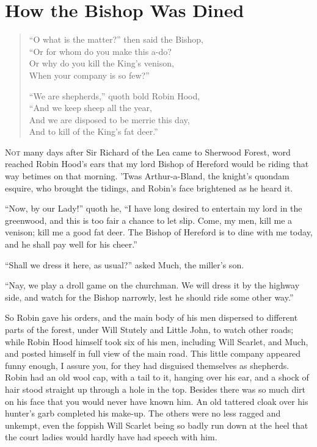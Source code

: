 \chapter{How the Bishop Was Dined}

\begin{quote}
``O what is the matter?'' then said the Bishop,\\
``Or for whom do you make this a-do?\\
Or why do you kill the King's venison,\\
When your company is so few?''

``We are shepherds,'' quoth bold Robin Hood,\\
``And we keep sheep all the year,\\
And we are disposed to be merrie this day,\\
And to kill of the King's fat deer.''
\end{quote}

\lettrine{N}{ot} many days after Sir Richard of the Lea came to Sherwood
Forest, word reached Robin Hood's ears that my lord Bishop of Hereford
would be riding that way betimes on that morning. 'Twas Arthur-a-Bland,
the knight's quondam esquire, who brought the tidings, and Robin's face
brightened as he heard it.

``Now, by our Lady!'' quoth he, ``I have long desired to entertain my
lord in the greenwood, and this is too fair a chance to let slip. Come,
my men, kill me a venison; kill me a good fat deer. The Bishop of
Hereford is to dine with me today, and he shall pay well for his
cheer.''

``Shall we dress it here, as usual?'' asked Much, the miller's son.

``Nay, we play a droll game on the churchman. We will dress it by the
highway side, and watch for the Bishop narrowly, lest he should ride
some other way.''

So Robin gave his orders, and the main body of his men dispersed to
different parts of the forest, under Will Stutely and Little John, to
watch other roads; while Robin Hood himself took six of his men,
including Will Scarlet, and Much, and posted himself in full view of the
main road. This little company appeared funny enough, I assure you, for
they had disguised themselves as shepherds. Robin had an old wool cap,
with a tail to it, hanging over his ear, and a shock of hair stood
straight up through a hole in the top. Besides there was so much dirt on
his face that you would never have known him. An old tattered cloak over
his hunter's garb completed his make-up. The others were no less ragged
and unkempt, even the foppish Will Scarlet being so badly run down at
the heel that the court ladies would hardly have had speech with him.

